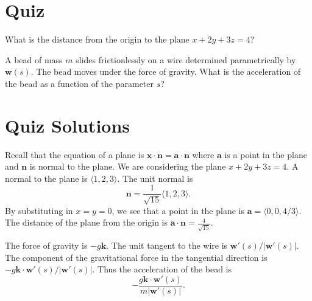 \raggedbottom
\pagebreak
\flushbottom
\section{Quiz}


\begin{QuizProblem}
  \label{quiz problem distance plane x+2y+3z=4}
  What is the distance from the origin to the plane $x + 2 y + 3 z = 4$?

\end{QuizProblem}


\begin{QuizProblem}
  \label{quiz problem bead on a wire}
  A bead of mass $m$ slides frictionlessly on a wire determined
  parametrically by $\mathbf{w}(s)$.  The bead moves under the force of
  gravity.  What is the acceleration of the bead as a function of the
  parameter $s$?

\end{QuizProblem}









\raggedbottom
\pagebreak
\flushbottom
\section{Quiz Solutions}


\begin{QuizSolution}
  \label{quiz solution distance plane x+2y+3z=4}
  Recall that the equation of a plane is 
  $\mathbf{x} \cdot \mathbf{n} = \mathbf{a} \cdot \mathbf{n}$ where $\mathbf{a}$ 
  is a point in the plane and $\mathbf{n}$ is normal to the plane.  
  We are considering the plane $x + 2 y + 3 z = 4$.  A normal to the 
  plane is $\langle 1, 2, 3 \rangle$.  The unit normal is
  \[
  \mathbf{n} = \frac{1}{\sqrt{15}} \langle 1, 2, 3 \rangle.
  \]
  By substituting in $x = y = 0$, we see that a point in the plane is
  $\mathbf{a} = \langle 0, 0, 4/3 \rangle$.  The distance of the plane from the origin is
  $\mathbf{a} \cdot \mathbf{n} = \frac{4}{\sqrt{15}}$.
\end{QuizSolution}


\begin{QuizSolution}
  \label{quiz solution bead on a wire}
  The force of gravity is $- g \mathbf{k}$.  The unit tangent to the wire is 
  $\mathbf{w}'(s) / |\mathbf{w}'(s)|$.    The component of the gravitational 
  force in the tangential direction is 
  $- g \mathbf{k} \cdot \mathbf{w}'(s) / | \mathbf{w}'(s) |$.
  Thus the acceleration of the bead is
  \[
  - \frac{g \mathbf{k} \cdot \mathbf{w}'(s)}{m | \mathbf{w}'(s) |}.
  \]
\end{QuizSolution}




\raggedbottom



